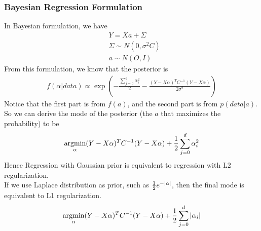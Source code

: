\subsubsection{Bayesian Regression Formulation}
In Bayesian formulation, we have 
    \begin{align*}
        & Y = Xa + \Sigma\\
        & \Sigma \sim N(0, \sigma^2 C) \tag{$C$ is known, but $\sigma^2$ is unknown} \\
        & a \sim N(O, I) \tag{Gaussian Prior} 
    \end{align*}
From this formulation, we know that the posterior is 
    \begin{align*}
        f(\alpha|data) \propto \exp\left(-\frac{\sum_{j=0}^d \alpha_i^2}{2} - \frac{(Y-X\alpha)^TC^{-1}(Y-X\alpha)}{2\sigma^2} \right)
    \end{align*}
Notice that the first part is from $f(a)$, and the second part is from $p(data|a)$. So we can derive the mode of the posterior (the $a$ that maximizes the probability) to be 
    \begin{align*}
        \operatorname*{argmin}_\alpha (Y-X\alpha)^T C^{-1} (Y-X\alpha) + \frac{1}{2}\sum_{j=0}^d \alpha_i^2
    \end{align*}
Hence Regression with Gaussian prior is equivalent to regression with L2 regularization. \\

If we use Laplace distribution as prior, such as $\frac{1}{2}e^{-\left| \alpha \right|}$, then the final mode is equivalent to L1 regularization. 
    \begin{align*}
        \operatorname*{argmin}_\alpha (Y-X\alpha)^T C^{-1} (Y-X\alpha) + \frac{1}{2}\sum_{j=0}^d \left| \alpha_i \right|
    \end{align*}        
    
